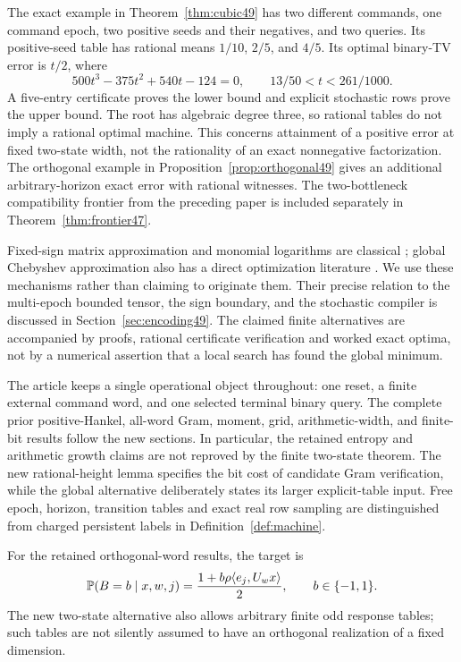 The exact example in Theorem~\ref{thm:cubic49} has two different
commands, one command epoch, two positive seeds and their negatives,
and two queries. Its positive-seed table has rational means
$1/10$, $2/5$, and $4/5$. Its optimal binary-TV error is $t/2$, where
\[
 500t^3-375t^2+540t-124=0,\qquad 13/50<t<261/1000.
\]
A five-entry certificate proves the lower bound and explicit
stochastic rows prove the upper bound. The root has algebraic degree
three, so rational tables do not imply a rational optimal machine.
This concerns attainment of a positive error at fixed two-state
width, not the rationality of an exact nonnegative factorization.
The orthogonal example in Proposition~\ref{prop:orthogonal49} gives
an additional arbitrary-horizon exact error with rational witnesses.
The two-bottleneck compatibility frontier from the preceding paper
is included separately in Theorem~\ref{thm:frontier47}.

Fixed-sign matrix approximation and monomial logarithms are classical
\cite{GS19,BKVH07}; global Chebyshev approximation also has a direct
optimization literature \cite{MSZ23}. We use these mechanisms rather
than claiming to originate them. Their precise relation to the
multi-epoch bounded tensor, the sign boundary, and the stochastic
compiler is discussed in Section~\ref{sec:encoding49}. The claimed
finite alternatives are accompanied by proofs, rational certificate
verification and worked exact optima, not by a numerical assertion
that a local search has found the global minimum.

The article keeps a single operational object throughout: one reset,
a finite external command word, and one selected terminal binary
query. The complete prior positive-Hankel, all-word Gram, moment,
grid, arithmetic-width, and finite-bit results follow the new
sections. In particular, the retained entropy and arithmetic growth
claims are not reproved by the finite two-state theorem. The new
rational-height lemma specifies the bit cost of candidate Gram
verification, while the global alternative deliberately states its
larger explicit-table input. Free epoch, horizon, transition tables
and exact real row sampling are distinguished from charged persistent
labels in Definition~\ref{def:machine}.

For the retained orthogonal-word results, the target is
\begin{equation}\label{eq:target}
 \mathbb P(B=b\mid x,w,j)=\frac{1+b\rho\langle e_j,U_wx\rangle}2,
 \qquad b\in\{-1,1\}.
\end{equation}
The new two-state alternative also allows arbitrary finite odd response
 tables; such tables are not silently assumed to have an orthogonal
 realization of a fixed dimension.
